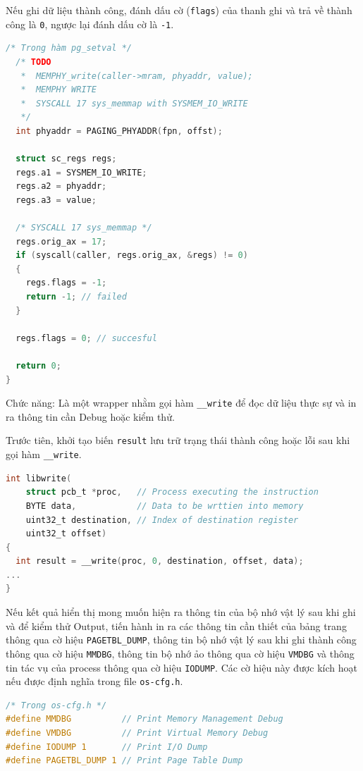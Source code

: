 Nếu ghi dữ liệu thành công, đánh dấu cờ (\texttt{flags}) của thanh ghi và trả về thành công là \texttt{0}, ngược lại đánh dấu cờ là \texttt{-1}.

\begin{lstlisting}[style=Cstyle,language=C]
/* Trong hàm pg_setval */
  /* TODO
   *  MEMPHY_write(caller->mram, phyaddr, value);
   *  MEMPHY WRITE
   *  SYSCALL 17 sys_memmap with SYSMEM_IO_WRITE
   */
  int phyaddr = PAGING_PHYADDR(fpn, offst);

  struct sc_regs regs;
  regs.a1 = SYSMEM_IO_WRITE;
  regs.a2 = phyaddr;
  regs.a3 = value;

  /* SYSCALL 17 sys_memmap */
  regs.orig_ax = 17;
  if (syscall(caller, regs.orig_ax, &regs) != 0)
  {
    regs.flags = -1;
    return -1; // failed
  }

  regs.flags = 0; // succesful

  return 0;
}
\end{lstlisting}


Chức năng: Là một wrapper nhằm gọi hàm \texttt{\_\_write} để đọc dữ liệu thực sự và in ra thông tin cần Debug hoặc kiểm thử.

Trước tiên, khởi tạo biến \texttt{result} lưu trữ trạng thái thành công hoặc lỗi sau khi gọi hàm \texttt{\_\_write}.

\begin{lstlisting}[style=Cstyle,language=C]
int libwrite(
    struct pcb_t *proc,   // Process executing the instruction
    BYTE data,            // Data to be wrttien into memory
    uint32_t destination, // Index of destination register
    uint32_t offset)
{  
  int result = __write(proc, 0, destination, offset, data);
...
}
\end{lstlisting} 

Nếu kết quả hiển thị mong muốn hiện ra thông tin của bộ nhớ vật lý sau khi ghi và để kiểm thử Output, tiến hành in ra các thông tin cần thiết của bảng trang thông qua cờ hiệu \texttt{PAGETBL\_DUMP}, thông tin bộ nhớ vật lý sau khi ghi thành công thông qua cờ hiệu \texttt{MMDBG}, thông tin bộ nhớ ảo thông qua cờ hiệu \texttt{VMDBG} và thông tin tác vụ của process thông qua cờ hiệu \texttt{IODUMP}. Các cờ hiệu này được kích hoạt nếu được định nghĩa trong file \texttt{os-cfg.h}.

\begin{lstlisting}[style=Cstyle,language=C]
/* Trong os-cfg.h */
#define MMDBG          // Print Memory Management Debug
#define VMDBG          // Print Virtual Memory Debug
#define IODUMP 1       // Print I/O Dump
#define PAGETBL_DUMP 1 // Print Page Table Dump
\end{lstlisting} 

